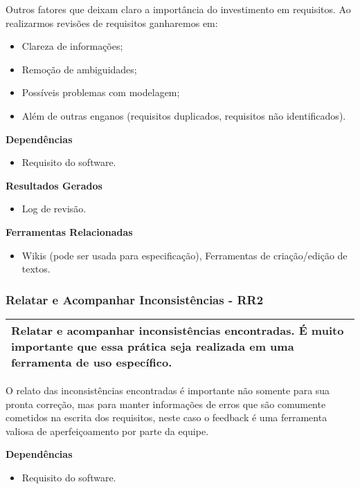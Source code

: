 Outros fatores que deixam claro a importância do investimento em requisitos. Ao realizarmos revisões de requisitos ganharemos em:

\begin{itemize}
    \item Clareza de informações;
    \item Remoção de ambiguidades;
    \item Possíveis problemas com modelagem;
    \item Além de outras enganos (requisitos duplicados, requisitos não identificados).
\end{itemize}

\textbf{Dependências}
\begin{itemize}
    \item Requisito do software.
\end{itemize}

\textbf{Resultados Gerados}
\begin{itemize}
    \item Log de revisão.
\end{itemize}

\textbf{Ferramentas Relacionadas}
\begin{itemize}
    \item Wikis (pode ser usada para especificação), Ferramentas de criação/edição de textos.
\end{itemize}

\subsubsection{Relatar e Acompanhar Inconsistências - RR2}
\label{sec:rr2}

\begin{table}[!ht]
\centering
\begin{tabular}{|p{130mm}|}
\hline
Relatar e acompanhar inconsistências encontradas. É muito importante que essa prática seja realizada em uma ferramenta de uso específico. \\ 
\hline
\end{tabular}
\end{table}

O relato das inconsistências encontradas é importante não somente para sua pronta correção, mas para manter informações de erros que são comumente cometidos na escrita dos requisitos, neste caso o feedback é uma ferramenta valiosa de aperfeiçoamento por parte da equipe.

\textbf{Dependências}
\begin{itemize}
    \item Requisito do software.
\end{itemize}

